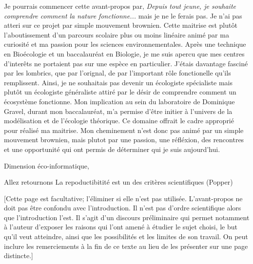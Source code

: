 Je pourrais commencer cette avant-propos par, \textit{Depuis tout jeune, je souhaite comprendre
comment la nature fonctionne...} mais je ne le ferais pas. Je n'ai pas atteri sur ce projet par
simple mouvement brownien. Cette maitrise est plutôt l'aboutissement d'un parcours scolaire plus ou
moins linéaire animé par ma curiosité et ma passion pour les sciences environnementales. Après une
technique en Bioécologie et un baccalauréat en Biologie, je me suis apercu que mes centres
d'interêts ne portaient pas sur une espèce en particulier. J'étais davantage fasciné par les
lombrics, que par l'orignal, de par l'important rôle fonctionelle qu'ils remplissent. Ainsi, je ne
souhaitais pas devenir un écologiste spécialiste mais plutôt un écologiste généraliste attiré par le
désir de comprendre comment un écosystème fonctionne. Mon implication au sein du laboratoire de
Dominique Gravel, durant mon baccalauréat, m'a permise d'être initier à l'univers de la modélisation
et de l'écologie théorique. Ce domaine offrait le cadre approprié pour réalisé ma maitrise. Mon
cheminement n'est donc pas animé par un simple mouvement brownien, mais plutot par une passion, une
réfléxion, des rencontres et une opportunité qui ont permis de déterminer qui je suis aujourd'hui.

Dimension éco-informatique,

Allez retournons 
La repoductibitité est un des critères scientifiques (Popper)

[Cette page est facultative; l’éliminer si elle n’est pas utilisée. L’avant-propos ne doit pas être confondu avec l'introduction. Il n’est pas d’ordre scientifique alors que l’introduction l’est. Il s’agit d'un discours préliminaire qui permet notamment à l'auteur d'exposer les raisons qui l'ont amené à étudier le sujet choisi, le but qu'il veut atteindre, ainsi que les possibilités et les limites de son travail. On peut inclure les remerciements à la fin de ce texte au lieu de les présenter sur une page distincte.]


